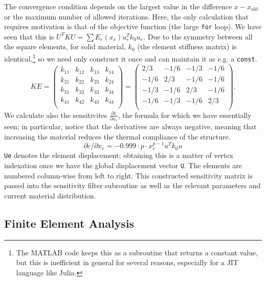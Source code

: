 The convergence condition depends on the largest value in the difference $x - x_\text{old}$ or the maximum number of allowed iterations.
Here, the only calculation that requires motivation is that of the objective function (the large \texttt{for} loop).
We have seen that this is $U^T K U = \sum E_e(x_e) u_e^T k_0 u_e$. Due to the symmetry between all the square elements, for solid material,
$k_0$ (the element stiffness matrix) is identical,\footnote{The MATLAB code keeps this as a subroutine that returns a constant value,
but this is inefficient in general for several reasons, especially for a JIT language like Julia.} so we need only construct it once and can maintain it as e.g. a \texttt{const}.
\begin{equation}
    KE = \begin{pmatrix}
        k_{11} & k_{12} & k_{13} & k_{14} \\
        k_{21} & k_{22} & k_{23} & k_{24} \\
        k_{31} & k_{32} & k_{33} & k_{34} \\
        k_{41} & k_{42} & k_{43} & k_{44} \\
    \end{pmatrix} = \begin{pmatrix}
        2/3 & -1/6 & -1/3 & -1/6 \\
        -1/6 & 2/3 & -1/6 & -1/6 \\
        -1/3 & -1/6 & 2/3 & -1/6 \\
        -1/6 & -1/3 & -1/6 & 2/3 \\
    \end{pmatrix}.
\end{equation}
We calculate also the sensitivites $\frac{\partial c}{\partial x_e}$, the formula for which we have essentially seen; in particular,
notice that the derivatives are always negative, meaning that increasing the material reduces the thermal compliance of the structure.
\begin{equation}
    \partial c / \partial x_e = -0.999 \cdot p \cdot x_e^{p-1} u^T k_0 u
\end{equation}
\texttt{Ue} denotes the element displacement; obtaining this is a matter of vertex indexation once we have the global displacement vector
\texttt{U}. The elements are numbered column-wise from left to right. This constructed sensitivity matrix is passed into the sensitivity filter subroutine as well as the relevant parameters and current
material distribution.

\subsection{Finite Element Analysis}


